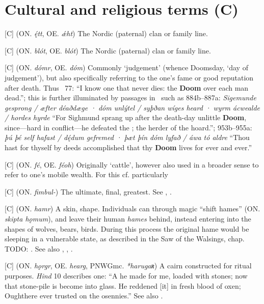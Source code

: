 
\section{Cultural and religious terms (C)}
\begin{itemize}

[C] (ON. \emph{ę́tt}, OE. \emph{ǽht})
  The Nordic (paternal) clan or family line.

[C] (ON. \emph{blót}, OE. \emph{blót})
  The Nordic (paternal) clan or family line.

[C] (ON. \emph{dómr}, OE. \emph{dóm})
  Commonly ‘judgement’ (whence Doomsday, ‘day of judgement’), but also specifically referring to the one’s fame or good reputation after death. Thus \Havamal\ 77: “I know one that never dies: the \textbf{Doom} over each man dead.”; this is further illuminated by passages in \Beowulf\ such as 884b–887a: \emph{Sigemunde gesprong / æfter déaðdæge · dóm unlýtel / syþðan wíges heard · wyrm ácwealde / hordes hyrde} “For Sighmund sprang up after the death-day unlittle \textbf{Doom}, since—hard in conflict—he defeated the ; the herder of the hoard.”; 953b–955a: \emph{þú þé self hafast / dę́dum gefremed · þæt þín dóm lyfað / áwa tó aldre} “Thou hast for thyself by deeds accomplished that thy \textbf{Doom} lives for ever and ever.”

[C] (ON. \emph{fé}, OE. \emph{féoh})
  Originally ‘cattle’, however also used in a broader sense to refer to one’s mobile wealth. For this cf. particularly \Havamal

[C] (ON. \emph{fimbul-})
  The ultimate, final, greatest. See , .

[C] (ON. \emph{hamr})
  A skin, shape. Individuals can through magic “shift hames” (ON. \emph{skipta hǫmum}), and leave their human \emph{hames} behind, instead entering into the shapes of wolves, bears, birds. During this process the original hame would be sleeping in a vulnerable state, as described in the Saw of the Walsings, chap. TODO: . See also , , .

[C] (ON. \emph{hǫrgr}, OE. \emph{hearg}, PNWGmc. \emph{*harugaʀ})
  A cairn constructed for ritual purposes. \emph{Hind} 10 describes one: “A  he made for me, loaded with stones; now that stone-pile is become into glass. He reddened [it] in fresh blood of oxen; Oughthere ever trusted on the osennies.” See also .


\end{itemize}
